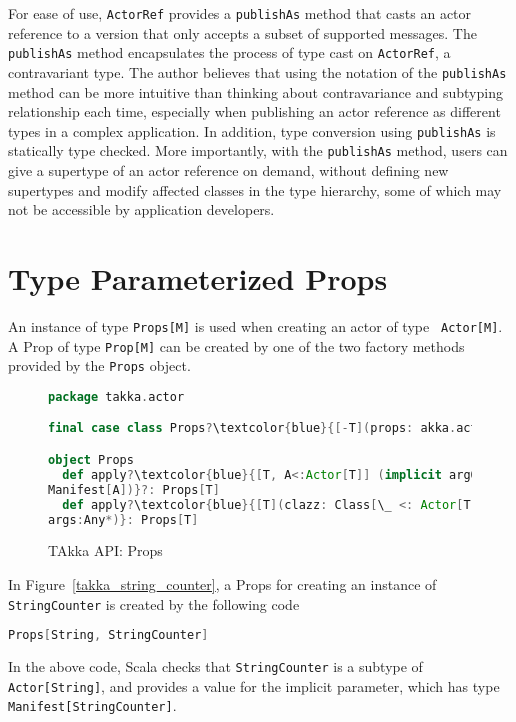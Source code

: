 For ease of use, {\tt ActorRef} provides a {\tt publishAs} method that 
casts an actor reference to a version that only accepts a subset of supported 
messages.  The {\tt publishAs} method encapsulates the process of type cast on 
{\tt ActorRef}, a contravariant type.  The author believes that using the 
notation of the {\tt publishAs} method can be more intuitive than thinking 
about contravariance 
and subtyping relationship each time, especially when publishing an actor 
reference as different types in a complex application.  In addition, type 
conversion using {\tt publishAs} is statically type checked.  More importantly, 
with the {\tt publishAs} method, users can give a supertype of an actor 
reference on demand, without defining new supertypes and modify affected 
classes in the type hierarchy, some of which may not be accessible by application developers.

\section{Type Parameterized Props}
\label{takka_actor_porps}
An instance of type {\tt Props[M]} is used when creating an actor of type {\tt 
Actor[M]}.  A Prop of type {\tt Prop[M]} can be created by one of 
the two factory methods provided by the {\tt Props} object.

\begin{figure}[!h]
\begin{lstlisting}[language=scala, escapechar=?]
package takka.actor

final case class Props?\textcolor{blue}{[-T](props: akka.actor.Props)}?

object Props
  def apply?\textcolor{blue}{[T, A<:Actor[T]] (implicit arg0: 
Manifest[A])}?: Props[T] 
  def apply?\textcolor{blue}{[T](clazz: Class[\_ <: Actor[T]], 
args:Any*)}: Props[T]
\end{lstlisting}
    \caption{TAkka API: Props}
    \label{takka_props}
\end{figure}

In Figure~\ref{takka_string_counter}, a Props for creating an instance of {\tt 
StringCounter} is created by the following code
\begin{lstlisting}[language=scala]
  Props[String, StringCounter]
\end{lstlisting}
In the above code, Scala checks that {\tt StringCounter} is a 
subtype of\\ {\tt Actor[String]}, and provides a value for the implicit 
parameter, which has type {\tt Manifest[StringCounter]}.

